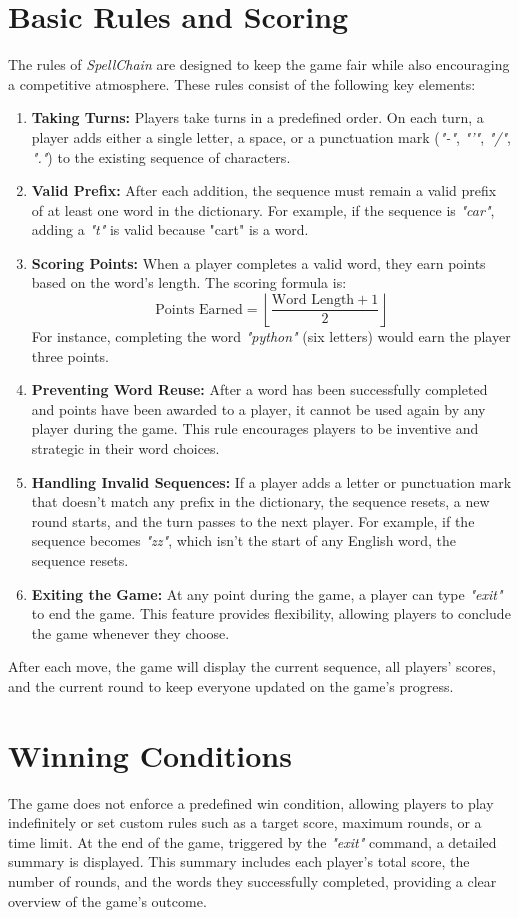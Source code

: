 \documentclass{article}
\begin{document}
\section*{Basic Rules and Scoring}
The rules of \textit{SpellChain} are designed to keep the game fair while also encouraging a competitive atmosphere. These rules consist of the following key elements:
\begin{enumerate}
    \item \textbf{Taking Turns:} Players take turns in a predefined order. On each turn, a player adds either a single letter, a space, or a punctuation mark (\textit{"-"}, \textit{"'"}, \textit{"/"}, \textit{"."}) to the existing sequence of characters.
    \item \textbf{Valid Prefix:} After each addition, the sequence must remain a valid prefix of at least one word in the dictionary. For example, if the sequence is \textit{"car"}, adding a \textit{"t"} is valid because "cart" is a word.
    \item \textbf{Scoring Points:} When a player completes a valid word, they earn points based on the word's length. The scoring formula is:
    \[
        \text{Points Earned} = \left\lfloor \frac{\text{Word Length} + 1}{2} \right\rfloor
    \]
    For instance, completing the word \textit{"python"} (six letters) would earn the player three points.
    \item \textbf{Preventing Word Reuse:} After a word has been successfully completed and points have been awarded to a player, it cannot be used again by any player during the game. This rule encourages players to be inventive and strategic in their word choices.
    \item \textbf{Handling Invalid Sequences:} If a player adds a letter or punctuation mark that doesn't match any prefix in the dictionary, the sequence resets, a new round starts, and the turn passes to the next player. For example, if the sequence becomes \textit{"zz"}, which isn't the start of any English word, the sequence resets.
    \item \textbf{Exiting the Game:} At any point during the game, a player can type \textit{"exit"} to end the game. This feature provides flexibility, allowing players to conclude the game whenever they choose.
\end{enumerate}
After each move, the game will display the current sequence, all players' scores, and the current round to keep everyone updated on the game's progress.

\section*{Winning Conditions}
The game does not enforce a predefined win condition, allowing players to play indefinitely or set custom rules such as a target score, maximum rounds, or a time limit. At the end of the game, triggered by the \textit{"exit"} command, a detailed summary is displayed. This summary includes each player's total score, the number of rounds, and the words they successfully completed, providing a clear overview of the game's outcome.
\end{document}
